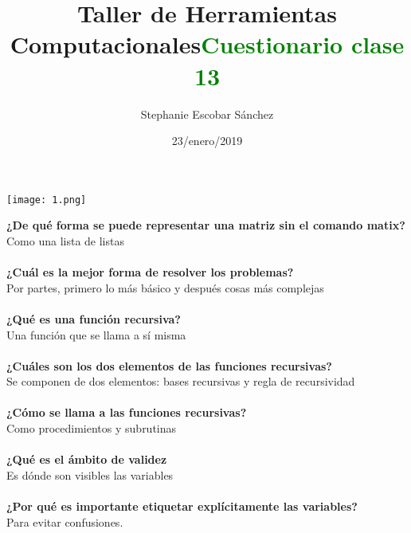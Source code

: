 \documentclass{article}
\title{\Huge Taller de Herramientas Computacionales}
\author{Stephanie Escobar Sánchez}
\date{23/enero/2019}
\begin{document}
	\maketitle
	\begin{center}
		\texttt{[image: 1.png]}	
	\end{center}
	\newpage
	\begin{center}
		\title {\textcolor{green}{\Huge \textbf{Cuestionario clase 13}} }  
	\end{center}
\textbf{¿De qué forma se puede representar una matriz sin el comando matix?}\\
Como una lista de listas\\
\\
\textbf{¿Cuál es la mejor forma de resolver los problemas?}\\
Por partes, primero lo más básico y después cosas más complejas\\
\\
\textbf{¿Qué es una función recursiva?}\\
Una función que se llama a sí misma\\
\\
\textbf{¿Cuáles son los dos elementos de las funciones recursivas?}\\
Se componen de dos elementos: bases recursivas y regla de recursividad\\
\\
\textbf{¿Cómo se llama a las funciones recursivas?}\\
Como procedimientos y subrutinas\\
\\
\textbf{¿Qué es el ámbito de validez}\\
Es dónde son visibles las variables\\
\\
\textbf{¿Por qué es importante etiquetar explícitamente las variables?}\\
Para evitar confusiones.
\end{document}
